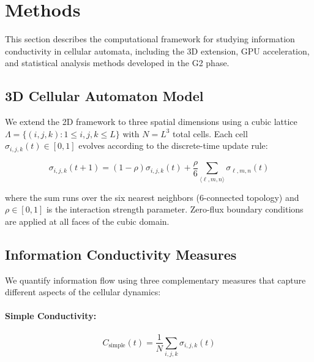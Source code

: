 \section{Methods\label{sec:methods}}

This section describes the computational framework for studying information 
conductivity in cellular automata, including the 3D extension, GPU acceleration, 
and statistical analysis methods developed in the G2 phase.

\subsection{3D Cellular Automaton Model}

We extend the 2D framework to three spatial dimensions using a cubic lattice 
$\Lambda = \{(i,j,k) : 1 \leq i,j,k \leq L\}$ with $N = L^3$ total cells. 
Each cell $\sigma_{i,j,k}(t) \in [0,1]$ evolves according to the discrete-time 
update rule:

\begin{equation}
\sigma_{i,j,k}(t+1) = (1-\rho)\sigma_{i,j,k}(t) + \frac{\rho}{6}\sum_{\langle \ell,m,n \rangle} \sigma_{\ell,m,n}(t)
\label{eq:ca3d_update}
\end{equation}

where the sum runs over the six nearest neighbors (6-connected topology) and 
$\rho \in [0,1]$ is the interaction strength parameter. Zero-flux boundary 
conditions are applied at all faces of the cubic domain.

\subsection{Information Conductivity Measures}

We quantify information flow using three complementary measures that capture 
different aspects of the cellular dynamics:

\paragraph{Simple Conductivity:}
\begin{equation}
C_{\text{simple}}(t) = \frac{1}{N}\sum_{i,j,k} \sigma_{i,j,k}(t)
\label{eq:simple}
\end{equation}

